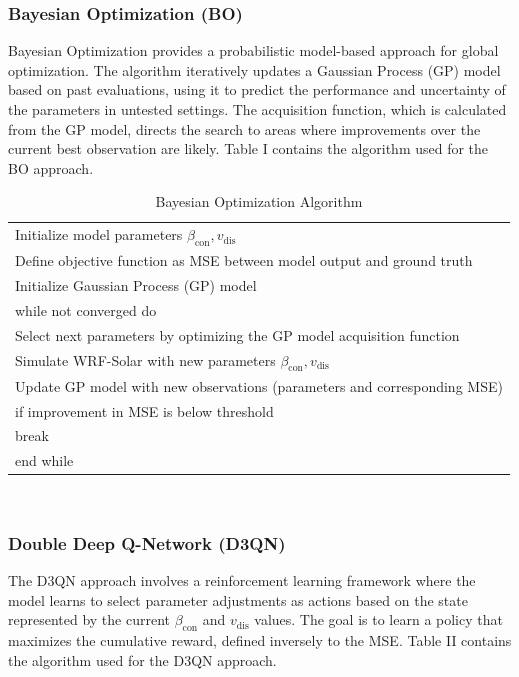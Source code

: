 \documentclass[conference]{IEEEtran}
\begin{document}
\subsubsection{Bayesian Optimization (BO)}
Bayesian Optimization provides a probabilistic model-based approach for global optimization. The algorithm iteratively updates a Gaussian Process (GP) model based on past evaluations, using it to predict the performance and uncertainty of the parameters in untested settings. The acquisition function, which is calculated from the GP model, directs the search to areas where improvements over the current best observation are likely. Table I contains the algorithm used for the BO approach.

\begin{table}[ht]
\centering
\begin{tabular}{l}
Initialize model parameters \(\beta_{\text{con}}, v_{\text{dis}}\)\\
Define objective function as MSE between model output and ground truth\\
Initialize Gaussian Process (GP) model\\[6pt]
while not converged do\\
\quad Select next parameters by optimizing the GP model acquisition function\\
\quad Simulate WRF-Solar with new parameters \(\beta_{\text{con}}, v_{\text{dis}}\)\\
\quad Update GP model with new observations (parameters and corresponding MSE)\\
\quad if improvement in MSE is below threshold\\
\quad\quad break\\
end while\\
\end{tabular}\\
\caption{Bayesian Optimization Algorithm}
\label{alg:bo}
\end{table}

\subsubsection{Double Deep Q-Network (D3QN)}
The D3QN approach involves a reinforcement learning framework where the model learns to select parameter adjustments as actions based on the state represented by the current \(\beta_{\text{con}}\) and \(v_{\text{dis}}\) values. The goal is to learn a policy that maximizes the cumulative reward, defined inversely to the MSE. Table II contains the algorithm used for the D3QN approach.
\end{document}
